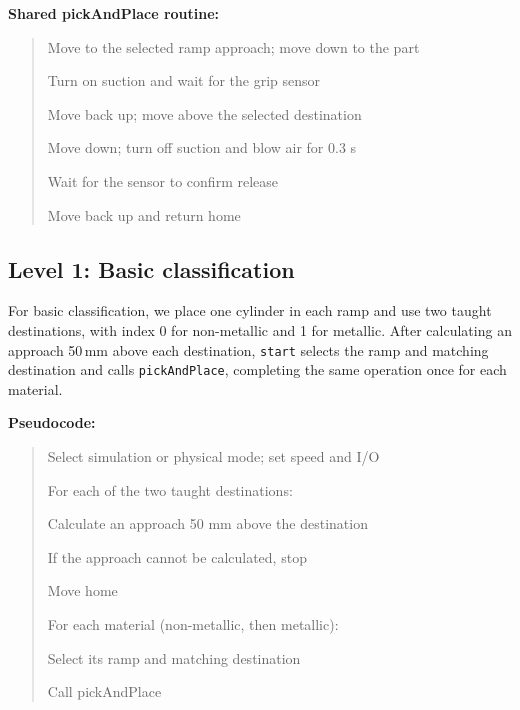 \documentclass[11pt,a4paper]{article}
\begin{document}
\noindent\begin{minipage}{\linewidth}
\textbf{Shared pickAndPlace routine:}
\begin{quote}\small\ttfamily\setlength{\parskip}{0pt}
Move to the selected ramp approach; move down to the part\par
Turn on suction and wait for the grip sensor\par
Move back up; move above the selected destination\par
Move down; turn off suction and blow air for 0.3 s\par
Wait for the sensor to confirm release\par
Move back up and return home
\end{quote}
\end{minipage}

\subsection{Level 1: Basic classification}
For basic classification, we place one cylinder in each ramp and use two taught destinations, with index 0 for non-metallic and 1 for metallic. After calculating an approach 50\,mm above each destination, \texttt{start} selects the ramp and matching destination and calls \texttt{pickAndPlace}, completing the same operation once for each material.

\noindent\begin{minipage}{\linewidth}
\textbf{Pseudocode:}
\begin{quote}\small\ttfamily\setlength{\parskip}{0pt}
Select simulation or physical mode; set speed and I/O\par
For each of the two taught destinations:\par
\hspace*{1em}Calculate an approach 50 mm above the destination\par
\hspace*{1em}If the approach cannot be calculated, stop\par
Move home\par
For each material (non-metallic, then metallic):\par
\hspace*{1em}Select its ramp and matching destination\par
\hspace*{1em}Call pickAndPlace\end{quote}
\end{minipage}
\end{document}
